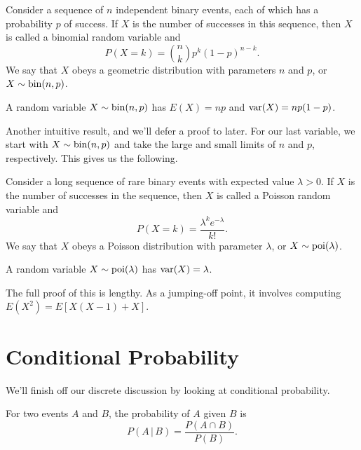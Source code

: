\documentclass[../m157main.tex]{subfiles}
\begin{document}
\begin{definition}
    Consider a sequence of $n$ independent binary events, each of which has a probability $p$ of success.
    If $X$ is the number of successes in this sequence, then $X$ is called a binomial random variable and
    \[ P(X = k) = \binom{n}{k} p^{k}(1 - p)^{n-k}. \]
    We say that $X$ obeys a geometric distribution with parameters $n$ and $p$, or $X \sim \operatorname{bin}(n,p)$.
\end{definition}

\begin{theorem}
    A random variable $X \sim \operatorname{bin}(n,p)$ has $E(X) = np$ and $\operatorname{var}(X) = np (1-p)$.
\end{theorem}

Another intuitive result, and we'll defer a proof to later.
For our last variable, we start with $X \sim \operatorname{bin}(n,p)$ and take the large and small limits of $n$ and $p$, respectively.
This gives us the following.

\begin{definition}
    Consider a long sequence of rare binary events with expected value $\lambda > 0$.
    If $X$ is the number of successes in the sequence, then $X$ is called a Poisson random variable and
    \[ P(X = k) = \frac{\lambda^{k} e^{-\lambda}}{k!}. \]
    We say that $X$ obeys a Poisson distribution with parameter $\lambda$, or $X \sim \operatorname{poi}(\lambda)$.
\end{definition}

\begin{theorem}
    A random variable $X \sim \operatorname{poi}(\lambda)$ has $\operatorname{var}(X) = \lambda$.
\end{theorem}

The full proof of this is lengthy.
As a jumping-off point, it involves computing $E(X^2) = E[X(X-1) + X]$.

\section{Conditional Probability}
We'll finish off our discrete discussion by looking at conditional probability.

\begin{definition}
    For two events $A$ and $B$, the probability of $A$ given $B$ is
    \[ P(A \,|\, B) = \frac{P(A \cap B)}{P(B)}. \]
\end{definition}
\end{document}
